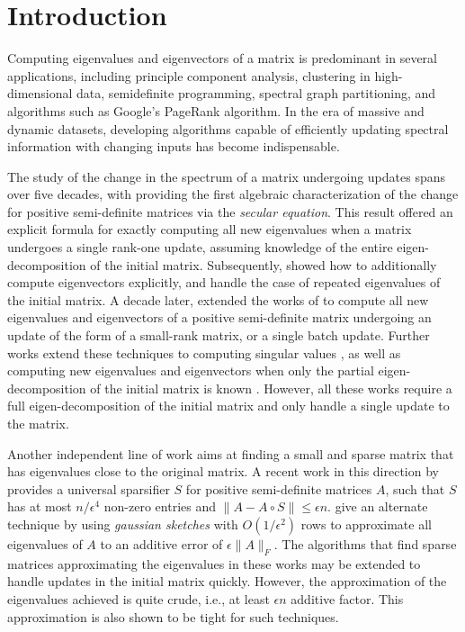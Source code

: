 \documentclass[11pt]{article}
\renewcommand\AA{\boldsymbol{\mathit{A}}}
\renewcommand\SS{\boldsymbol{\mathit{S}}}
\begin{document}
	\newpage
	\tableofcontents
	\newpage
	
	



\section{Introduction}

Computing eigenvalues and eigenvectors of a matrix is predominant in several applications, including principle component analysis, clustering in high-dimensional data, semidefinite programming, spectral graph partitioning, and algorithms such as Google's PageRank algorithm. In the era of massive and dynamic datasets, developing algorithms capable of efficiently updating spectral information with changing inputs has become indispensable.

The study of the change in the spectrum of a matrix undergoing updates spans over five decades, with \textcite{golub1973some} providing the first algebraic characterization of the change for positive semi-definite matrices via the {\it secular equation}. This result offered an explicit formula for exactly computing all new eigenvalues when a matrix undergoes a single rank-one update, assuming knowledge of the entire eigen-decomposition of the initial matrix. Subsequently, \textcite{bunch1978rank} showed how to additionally compute eigenvectors explicitly, and handle the case of repeated eigenvalues of the initial matrix. A decade later, \textcite{arbenz1988restricted} extended the works of \cite{golub1973some,bunch1978rank} to compute all new eigenvalues and eigenvectors of a positive semi-definite matrix undergoing an update of the form of a small-rank matrix, or a single batch update. Further works extend these techniques to computing singular values \cite{stange2008efficient}, as well as computing new eigenvalues and eigenvectors when only the partial eigen-decomposition of the initial matrix is known \cite{mitz2019symmetric}. However, all these works require a full eigen-decomposition of the initial matrix and only handle a single update to the matrix. 

Another independent line of work aims at finding a small and sparse matrix that has eigenvalues close to the original matrix. 
A recent work in this direction by \textcite{bhattacharjee2023universal} provides a universal sparsifier $\SS$ for positive semi-definite matrices $\AA$, such that $\SS$ has at most $n/\epsilon^4$ non-zero entries and $\|\AA-\AA\circ\SS\|\leq \epsilon n$. \textcite{swartworth2023optimal} give an alternate technique by using {\it gaussian sketches} with $O(1/\epsilon^2)$ rows to approximate all eigenvalues of $\AA$ to an additive error of $\epsilon\|\AA\|_F$. The algorithms that find sparse matrices approximating the eigenvalues in these works may be extended to handle updates in the initial matrix quickly. However, the approximation of the eigenvalues achieved is quite crude, i.e., at least $\epsilon n$ additive factor. This approximation is also shown to be tight for such techniques.
\end{document}
